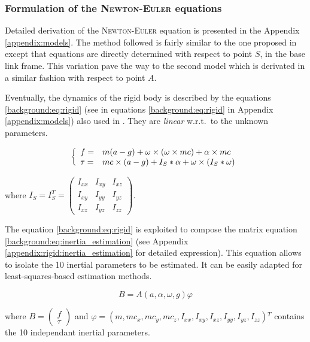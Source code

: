 \documentclass[/home/francois/latex/report/main.tex]{subfiles}
\begin{document}
\subsubsection{Formulation of the \textsc{Newton-Euler} equations}
\label{subsubsection:background_newton_equation}

Detailed derivation of the \textsc{Newton-Euler} equation is presented in the Appendix \ref{appendix:models}. The method followed is fairly similar to the one proposed in \cite{An1985} except that equations are directly determined with respect to point $S$, in the base link frame. This variation pave the way to the second model which is derivated in a similar fashion with respect to point $A$.

Eventually, the dynamics of the rigid body is described by the equations \ref{background:eq:rigid} (see in equations \ref{background:eq:rigid} in Appendix \ref{appendix:models}) also used in \cite{Kubus2008, Kubus2007, Kubus2014, Farsoni2018}. They are \textit{linear} w.r.t.\ to the unknown parameters.

\begin{equation}
 \label{background:eq:rigid}
 \left \{
 \begin{array}{l l}
  f =    & m (a - g) + \omega \times (\omega \times m c) + \alpha \times m c \\
  \tau = & m c \times (a - g)
  + I_{S} \ast \alpha + \omega \times (I_{S} \ast \omega)
 \end{array}
 \right.
\end{equation}

where $I_S = I_S^T =
\begin{pmatrix}
 I_{xx} & I_{xy} & I_{xz} \\
 I_{xy} & I_{yy} & I_{yz} \\
 I_{xz} & I_{yz} & I_{zz}
\end{pmatrix}
$.

The equation \ref{background:eq:rigid} is exploited to compose the matrix equation \ref{background:eq:inertia_estimation} (see Appendix \ref{appendix:rigid:inertia_estimation} for detailed expression). This equation allows to isolate the 10 inertial parameters to be estimated. It can be easily adapted for least-squares-based estimation methods.

\begin{equation}
  \label{background:eq:inertia_estimation}
B = A(a, \alpha, \omega, g) \varphi
\end{equation}

where $B =  \begin{pmatrix} f \\ \tau \end{pmatrix}$ and $\varphi = (m, m c_x, m c_y, m c_z, I_{xx}, I_{xy}, I_{xz}, I_{yy}, I_{yz}, I_{zz}) {}^T$ contains the 10 independant inertial parameters.
\end{document}
